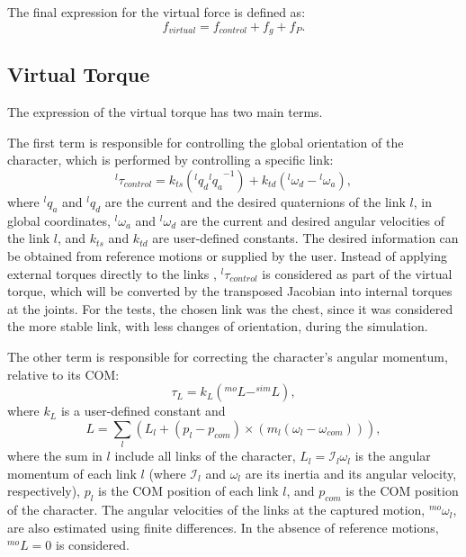 \documentclass[tog]{acmsiggraph}
\begin{document}
The final expression for the virtual force is defined as:
%
\begin{equation}
  f_{virtual} = f_{control} + f_{g} + f_{P}.
\end{equation}


\subsection{Virtual Torque}\label{torquevirtual}

The expression of the virtual torque has two main terms.

The first term is responsible for controlling the global orientation of the character, which is performed by controlling a specific link:
%
\begin{equation}
 ^{l}\tau_{control} = k_{ts}(^{l}q_{d} {^{l}q_{a}}^{-1}) + k_{td}(^{l}\omega_{d} - {^{l}\omega_{a}}),
 \label{eq:controletorque}
\end{equation}
%
where $^{l}q_{a}$ and $^{l}q_{d}$ are the current and the desired quaternions of the link $l$, in global coordinates, %
$^{l}\omega_{a}$ and $^{l}\omega_{d}$ are the current and desired angular velocities of the link $l$, and $k_{ts}$ and $k_{td}$ 
are user-defined constants.
The desired information can be obtained from reference motions or supplied by the user.
%
Instead of applying external torques directly to the links \cite{bib:Wrotek06}, $^{l}\tau_{control}$ is considered as part of the virtual torque,
which will be converted by the transposed Jacobian into internal torques at the joints.
For the tests, the chosen link was the chest, since it was considered the more stable link, with less changes of orientation, during the simulation.

The other term is responsible for correcting the character's angular momentum, relative to its COM: %
%
\begin{equation}
  \tau_{L} = k_{L} (^{mo}L - ^{sim}L),
\label{eq:momentola}
\end{equation}
%
where $k_{L}$ is a user-defined constant and
\begin{equation}
  L = \sum_l \left( L_{l} + \left( p_{l}-p_{com} \right) \times \left( m_{l} \left( \omega_{l}-\omega_{com} \right) \right)  \right),
\end{equation}
where the sum in $l$ include all links of the character, $L_{l} = \mathcal{I}_{l} \omega_{l}$ is the angular momentum of each link $l$
(where $\mathcal{I}_{l}$ and $\omega_{l}$ are its inertia and its angular velocity, respectively), $p_{l}$ is the COM position of each link $l$,
and $p_{com}$ is the COM position of the character.
The angular velocities of the links at the captured motion, $^{mo}\omega_{l}$, are also estimated using finite differences. %
In the absence of reference motions, $^{mo}L = 0$ is considered.
\end{document}
